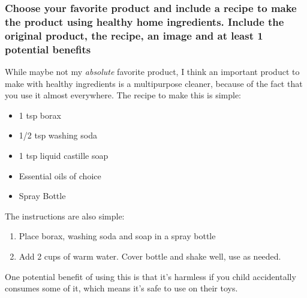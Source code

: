 \documentclass[11pt]{article}
\begin{document}
\subsubsection*{Choose your favorite product and include a recipe to make the product using healthy home ingredients. Include the original product, the recipe, an image and at least 1 potential benefits}
\label{sec:orgf3f3bfc}
While maybe not my \emph{absolute} favorite product, I think an important product to make with healthy ingredients is a multipurpose cleaner, because of the fact that you use it almost everywhere. The recipe to make this is simple:
\begin{itemize}
\item 1 tsp borax
\item 1/2 tsp washing soda
\item 1 tsp liquid castille soap
\item Essential oils of choice
\item Spray Bottle
\end{itemize}

The instructions are also simple:
\begin{enumerate}
\item Place borax, washing soda and soap in a spray bottle
\item Add 2 cups of warm water. Cover bottle and shake well, use as needed.
\end{enumerate}

One potential benefit of using this is that it's harmless if you child accidentally consumes some of it, which means it's safe to use on their toys.

{}

\end{document}
